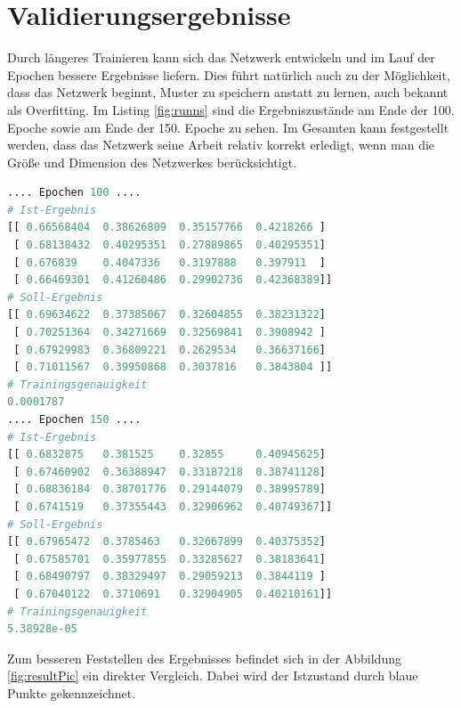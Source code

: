 \section{Validierungsergebnisse}

Durch längeres Trainieren kann sich das Netzwerk entwickeln und im Lauf der Epochen bessere Ergebnisse liefern. 
Dies führt natürlich auch zu der Möglichkeit, dass das Netzwerk beginnt, Muster zu speichern anstatt zu lernen, auch bekannt als Overfitting. 
Im Listing \ref{fig:runns} sind die Ergebniszustände am Ende der 100. Epoche sowie am Ende der 150. Epoche zu sehen. 
Im Gesamten kann festgestellt werden, dass das Netzwerk seine Arbeit relativ korrekt erledigt, wenn man die Größe und Dimension des Netzwerkes berücksichtigt. 
\begin{lstlisting}[caption={Ergebnisse am Ende der 100. Epoche und am Ende der 150. Epoche},label=fig:runns,captionpos=b,language=Python]
.... Epochen 100 ....
# Ist-Ergebnis 
[[ 0.66568404  0.38626809  0.35157766  0.4218266 ]
 [ 0.68138432  0.40295351  0.27889865  0.40295351]
 [ 0.676839    0.4047336   0.3197888   0.397911  ]
 [ 0.66469301  0.41260486  0.29902736  0.42368389]]
# Soll-Ergebnis
[[ 0.69634622  0.37385067  0.32604855  0.38231322]
 [ 0.70251364  0.34271669  0.32569841  0.3908942 ]
 [ 0.67929983  0.36809221  0.2629534   0.36637166]
 [ 0.71011567  0.39950868  0.3037816   0.3843804 ]]
# Trainingsgenauigkeit
0.0001787
.... Epochen 150 ....
# Ist-Ergebnis
[[ 0.6832875   0.381525    0.32855     0.40945625]
 [ 0.67460902  0.36388947  0.33187218  0.38741128]
 [ 0.68836184  0.38701776  0.29144079  0.38995789]
 [ 0.6741519   0.37355443  0.32906962  0.40749367]]
# Soll-Ergebnis
[[ 0.67965472  0.3785463   0.32667899  0.40375352]
 [ 0.67585701  0.35977855  0.33285627  0.38183641]
 [ 0.68490797  0.38329497  0.29059213  0.3844119 ]
 [ 0.67040122  0.3710691   0.32904905  0.40210161]]
# Trainingsgenauigkeit
5.38928e-05
\end{lstlisting}
Zum besseren Feststellen des Ergebnisses befindet sich in der Abbildung \ref{fig:resultPic} ein direkter Vergleich. 
Dabei wird der Istzustand durch blaue Punkte gekennzeichnet. 
